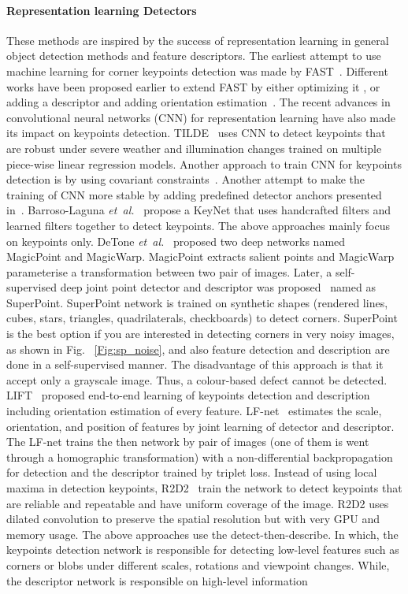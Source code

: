 \documentclass[journal]{IEEEtran}
\newcommand \andothers {\textit{et~al.}}
\begin{document}
\paragraph{Representation learning Detectors}
These methods are inspired by the success of representation learning in general object detection methods and feature descriptors. The earliest attempt to use machine learning for corner keypoints detection was made by FAST~\cite{rosten2006machine}. Different works have been proposed earlier to extend FAST by either optimizing it \cite{leutenegger2011brisk}, or adding a descriptor and adding orientation estimation~\cite{rublee2011orb}. The recent advances in convolutional neural networks (CNN) for representation learning have also made its impact on keypoints detection. TILDE~\cite{verdie2015tilde} uses CNN to detect keypoints that are robust under severe weather and illumination changes trained on multiple piece-wise linear regression models. Another approach to train CNN for keypoints detection is by using covariant constraints~\cite{lenc2016learning}.  Another attempt to make the training of CNN more stable by adding predefined detector anchors presented in~\cite{zhang2017learning}. Barroso-Laguna \andothers~\cite{barroso2019key} propose a KeyNet that uses handcrafted filters and learned filters together to detect keypoints.  The above approaches mainly focus on keypoints only. DeTone \andothers~\cite{detone2017toward} proposed two deep networks named MagicPoint and MagicWarp. MagicPoint extracts salient points and MagicWarp parameterise a transformation between two pair of images. Later, a self-supervised deep joint point detector and descriptor was proposed~\cite{detone2018superpoint} named as SuperPoint. SuperPoint network is trained on synthetic shapes (rendered lines, cubes, stars, triangles, quadrilaterals, checkboards) to detect corners. SuperPoint is the best option if you are interested in detecting corners in very noisy images, as shown in Fig. ~\ref{Fig:sp_noise}, and also feature detection and description are done in a self-supervised manner. The disadvantage of this approach is that it accept only a grayscale image. Thus, a colour-based defect cannot be detected. LIFT~\cite{yi2016lift} proposed end-to-end learning of keypoints detection and description including orientation estimation of every feature. LF-net~\cite{ono2018lf} estimates the scale, orientation, and position of features by joint learning of detector and descriptor. The LF-net trains the then network by pair of images (one of them is went through a homographic transformation) with a non-differential backpropagation for detection and the descriptor trained by triplet loss. Instead of using local maxima in detection keypoints, R2D2~\cite{revaud2019r2d2} train the network to detect keypoints that are reliable and repeatable and have uniform coverage of the image. R2D2 uses dilated convolution to preserve the spatial resolution but with very GPU and memory usage. The above approaches use the detect-then-describe. In which, the keypoints detection network is responsible for detecting low-level features such as corners or blobs under different scales, rotations and viewpoint changes. While, the descriptor network is responsible on high-level information 
\end{document}
